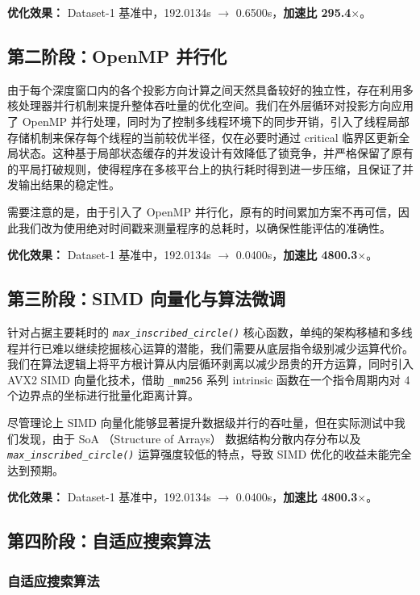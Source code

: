 \documentclass[12pt]{article}
\newcommand{\func}[1]{\textit{\texttt{#1}}}
\begin{document}
\textbf{优化效果：} Dataset-1 基准中，192.0134s $\rightarrow$ 0.6500s，\textbf{加速比 295.4$\times$}。

\subsection{第二阶段：OpenMP 并行化}

由于每个深度窗口内的各个投影方向计算之间天然具备较好的独立性，存在利用多核处理器并行机制来提升整体吞吐量的优化空间。我们在外层循环对投影方向应用了 OpenMP 并行处理，同时为了控制多线程环境下的同步开销，引入了线程局部存储机制来保存每个线程的当前较优半径，仅在必要时通过 critical 临界区更新全局状态。这种基于局部状态缓存的并发设计有效降低了锁竞争，并严格保留了原有的平局打破规则，使得程序在多核平台上的执行耗时得到进一步压缩，且保证了并发输出结果的稳定性。

需要注意的是，由于引入了 OpenMP 并行化，原有的时间累加方案不再可信，因此我们改为使用绝对时间戳来测量程序的总耗时，以确保性能评估的准确性。

\textbf{优化效果：} Dataset-1 基准中，192.0134s $\rightarrow$ 0.0400s，\textbf{加速比 4800.3$\times$}。

\subsection{第三阶段：SIMD 向量化与算法微调}

针对占据主要耗时的 \func{max\_inscribed\_circle()} 核心函数，单纯的架构移植和多线程并行已难以继续挖掘核心运算的潜能，我们需要从底层指令级别减少运算代价。我们在算法逻辑上将平方根计算从内层循环剥离以减少昂贵的开方运算，同时引入 AVX2 SIMD 向量化技术，借助 \texttt{\_mm256} 系列 intrinsic 函数在一个指令周期内对 4 个边界点的坐标进行批量化距离计算。

尽管理论上 SIMD 向量化能够显著提升数据级并行的吞吐量，但在实际测试中我们发现，由于 SoA （Structure of Arrays） 数据结构分散内存分布以及 \func{max\_inscribed\_circle()} 运算强度较低的特点，导致 SIMD 优化的收益未能完全达到预期。

\textbf{优化效果：} Dataset-1 基准中，192.0134s $\rightarrow$ 0.0400s，\textbf{加速比 4800.3$\times$}。

\subsection{第四阶段：自适应搜索算法}

\subsubsection{自适应搜索算法}
\end{document}
